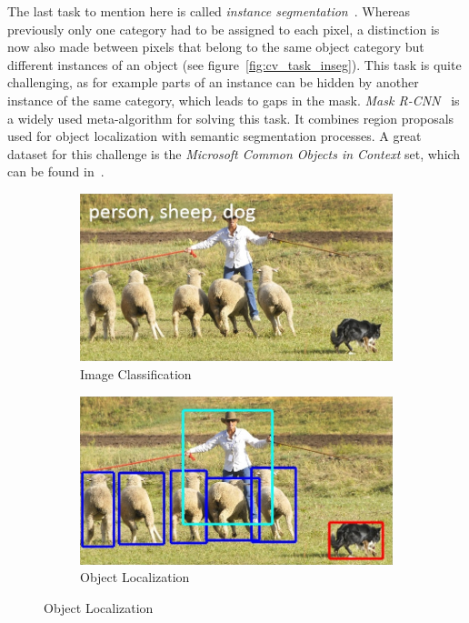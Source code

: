 The last task to mention here is called \emph{instance segmentation}~\cite{mask-rcnn14}. Whereas previously only one category had to be assigned to each pixel, a distinction is now also made between pixels that belong to the same object category but different instances of an object (see figure~\ref{fig:cv_task_inseg}). This task is quite challenging, as for example parts of an instance can be hidden by another instance of the same category, which leads to gaps in the mask. \emph{Mask R-CNN}~\cite{mask-rcnn14} is a widely used meta-algorithm for solving this task. It combines region proposals used for object localization with semantic segmentation processes. A great dataset for this challenge is the \emph{Microsoft Common Objects in Context} set, which can be found in~\cite{coco15}.

\begin{figure}
    \newcommand{\VisionTasksImageWidth}{0.4\textwidth}
    \centering
    \hfill
    \begin{subfigure}{\VisionTasksImageWidth}
        \includegraphics[width=\textwidth]{images/vision_task_1}
        \caption{Image Classification}
        \label{fig:cv_task_imgclass}
    \end{subfigure}
    \hfill
    \begin{subfigure}{\VisionTasksImageWidth}
        \includegraphics[width=\textwidth]{images/vision_task_2}
        \caption{Object Localization}
        \label{fig:cv_task_objloc}
    \end{subfigure}
    \hfill


\end{figure}
